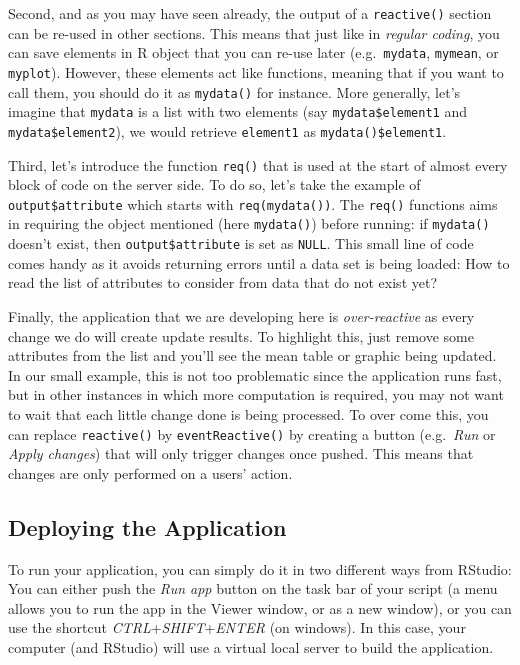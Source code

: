 \documentclass[
]{book}
\begin{document}
Second, and as you may have seen already, the output of a \texttt{reactive()} section can be re-used in other sections. This means that just like in \emph{regular coding}, you can save elements in R object that you can re-use later (e.g.~\texttt{mydata}, \texttt{mymean}, or \texttt{myplot}). However, these elements act like functions, meaning that if you want to call them, you should do it as \texttt{mydata()} for instance. More generally, let's imagine that \texttt{mydata} is a list with two elements (say \texttt{mydata\$element1} and \texttt{mydata\$element2}), we would retrieve \texttt{element1} as \texttt{mydata()\$element1}.

Third, let's introduce the function \texttt{req()} that is used at the start of almost every block of code on the server side. To do so, let's take the example of \texttt{output\$attribute} which starts with \texttt{req(mydata())}. The \texttt{req()} functions aims in requiring the object mentioned (here \texttt{mydata()}) before running: if \texttt{mydata()} doesn't exist, then \texttt{output\$attribute} is set as \texttt{NULL}. This small line of code comes handy as it avoids returning errors until a data set is being loaded: How to read the list of attributes to consider from data that do not exist yet?

Finally, the application that we are developing here is \emph{over-reactive} as every change we do will create update results. To highlight this, just remove some attributes from the list and you'll see the mean table or graphic being updated. In our small example, this is not too problematic since the application runs fast, but in other instances in which more computation is required, you may not want to wait that each little change done is being processed. To over come this, you can replace \texttt{reactive()} by \texttt{eventReactive()} by creating a button (e.g.~\emph{Run} or \emph{Apply changes}) that will only trigger changes once pushed. This means that changes are only performed on a users' action.

\hypertarget{deploying-the-application}{%
\subsection{Deploying the Application}\label{deploying-the-application}}

To run your application, you can simply do it in two different ways from RStudio: You can either push the \emph{Run app} button on the task bar of your script (a menu allows you to run the app in the Viewer window, or as a new window), or you can use the shortcut \emph{CTRL}+\emph{SHIFT}+\emph{ENTER} (on windows). In this case, your computer (and RStudio) will use a virtual local server to build the application.
\end{document}
